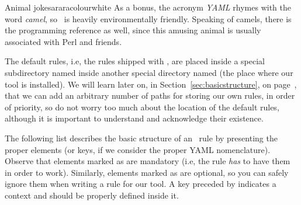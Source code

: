 \begin{messagebox}{Animal jokes}{araracolour}{\icok}{white}
As a bonus, the acronym \emph{YAML} rhymes with the word \emph{camel}, so \arara\ is heavily environmentally friendly. Speaking of camels, there is the programming reference as well, since this amusing animal is usually associated with Perl and friends.
\end{messagebox}

The default rules, i.e, the rules shipped with \arara, are placed inside a special subdirectory named  inside another special directory named  (the place where our tool is installed). We will learn later on, in Section~\ref{sec:basicstructure}, on page~\pageref{sec:basicstructure}, that we can add an arbitrary number of paths for storing our own rules, in order of priority, so do not worry too much about the location of the default rules, although it is important to understand and acknowledge their existence.

The following list describes the basic structure of an \arara\ rule by presenting the proper elements (or keys, if we consider the proper \gls{YAML} nomenclature). Observe that elements marked as  are mandatory (i.e, the rule \emph{has} to have them in order to work). Similarly, elements marked as  are optional, so you can safely ignore them when writing a rule for our tool. A key preceded by  indicates a context and should be properly defined inside it.

